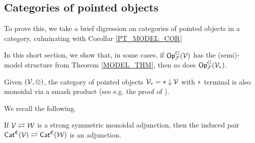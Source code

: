 \documentclass[a4paper,10pt
,draft
]{article}%
\renewcommand{\F}{\mathcal F}
\renewcommand{\1}{\eta}%
\begin{document}
{\color{OliveGreen} %
  \subsection{Categories of pointed objects}
  \label{PT_SEC}


  To prove this, we take a brief digression on categories of pointed objects in a category,
  culminating with Corollar \ref{PT_MODEL_COR}

  In this short section, we show that, in some cases,
  if $\Op^G_\F(\V)$ has the (semi)-model structure from Theorem \ref{MODEL_THM}, then so does $\Op^G_\F(\V_{\**})$.


  Given $(\mathcal V, \otimes)$, the category of pointed objects $\V_{\**} = \** \downarrow \V$ with $\**$ terminal
  is also monoidal via a smash product (see e.g. the proof of \cite[Prop. 4.2.9]{Hov99}).


  We recall the following.

  \begin{lemma}
        If $\mathcal V \rightleftarrows \mathcal W$ is a strong symmetric monoidal adjunction, then
        the induced pair $\mathsf{Cat}^{\mathfrak C}(\mathcal V) \rightleftarrows \mathsf{Cat}^{\mathfrak C}(\mathcal W)$ is an adjunction.
  \end{lemma}

}
\end{document}
